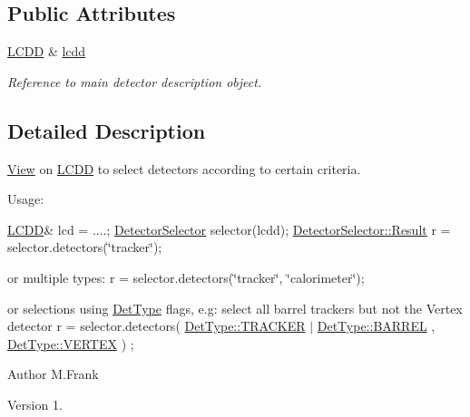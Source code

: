 \subsection*{Public Attributes}
\begin{DoxyCompactItemize}
\item 
\hyperlink{class_d_d4hep_1_1_geometry_1_1_l_c_d_d}{L\+C\+DD} \& \hyperlink{class_d_d4hep_1_1_geometry_1_1_detector_selector_a6091743fea97ad21aa2bca9e5da2d3d0}{lcdd}
\begin{DoxyCompactList}\small\item\em Reference to main detector description object. \end{DoxyCompactList}\end{DoxyCompactItemize}


\subsection{Detailed Description}
\hyperlink{class_d_d4hep_1_1_view}{View} on \hyperlink{class_d_d4hep_1_1_geometry_1_1_l_c_d_d}{L\+C\+DD} to select detectors according to certain criteria. 

Usage\+:

\hyperlink{class_d_d4hep_1_1_geometry_1_1_l_c_d_d}{L\+C\+DD}\& lcd = ....; \hyperlink{class_d_d4hep_1_1_geometry_1_1_detector_selector}{Detector\+Selector} selector(lcdd); \hyperlink{class_d_d4hep_1_1_geometry_1_1_detector_selector_a6ce0dfe8c83f5d36138244218f260ed1}{Detector\+Selector\+::\+Result} r = selector.\+detectors(\char`\"{}tracker\char`\"{});

or multiple types\+: r = selector.\+detectors(\char`\"{}tracker\char`\"{}, \char`\"{}calorimeter\char`\"{});

or selections using \hyperlink{class_d_d4hep_1_1_det_type}{Det\+Type} flags, e.\+g\+: select all barrel trackers but not the Vertex detector r = selector.\+detectors( \hyperlink{class_d_d4hep_1_1_det_type_aca757d7a9b865d1fb8f7997eb5c0a72cae974ecec59fd2a2900db7e5f44cd0884}{Det\+Type\+::\+T\+R\+A\+C\+K\+ER} $\vert$ \hyperlink{class_d_d4hep_1_1_det_type_aca757d7a9b865d1fb8f7997eb5c0a72caaca38656f429ac259f2aeb2a22359c1e}{Det\+Type\+::\+B\+A\+R\+R\+EL} , \hyperlink{class_d_d4hep_1_1_det_type_aca757d7a9b865d1fb8f7997eb5c0a72cadd4fea08e228d05a34ba2e613697d85e}{Det\+Type\+::\+V\+E\+R\+T\+EX} ) ;

\begin{DoxyAuthor}{Author}
M.\+Frank 
\end{DoxyAuthor}
\begin{DoxyVersion}{Version}
1. 
\end{DoxyVersion}


